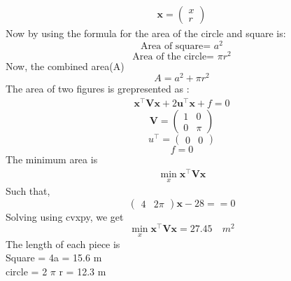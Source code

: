 \documentclass[journal,12pt,twocolumn]{IEEEtran}
\let\vec\mathbf
\newcommand{\myvec}[1]{\ensuremath{\begin{pmatrix}#1\end{pmatrix}}}
\begin{document}
\begin{align}
\vec{x}  = \myvec{x\\r}
\end{align}
Now by using the formula for the area of the circle and square is:
\begin{equation}
\text{Area of square= }a^2
\end{equation}
\begin{equation}
\text{Area of the circle= }\pi r^2
\end{equation}
Now, the combined area(A) 
\begin{equation}
A=a^2+\pi r^2
\end{equation}
The area of two figures is grepresented as :
\begin{align}
\vec{x}^{\top}\vec{V}\vec{x}+2\vec{u}^{\top}\vec{x}+f=0
\end{align}
\begin{equation}
\vec{V} = \begin{pmatrix}
1 & 0 \\
0 & \pi
\end{pmatrix}
\end{equation}
\begin{equation}
u^\top = \begin{pmatrix}
0 & 0
\end{pmatrix}
\end{equation}
\begin{equation}
f = 0
\end{equation}
\noindent The minimum area is 
\begin{align}
\min_{x} \vec{x}^{\top}\vec{V}\vec{x} 
\end{align}
\noindent Such that, 
\begin{equation}
\begin{pmatrix}4& 2\pi\end{pmatrix}  \vec{x} -28 == 0
\end{equation}
Solving using cvxpy, we get
\begin{equation}
\min_{x} \vec{x}^{\top}\vec{V}\vec{x} = 27.45 \quad m^2
\end{equation}
The length of each piece is \\
Square = 4a = 15.6 m \\
circle = 2 $\pi$ r = 12.3 m  
\end{document}
